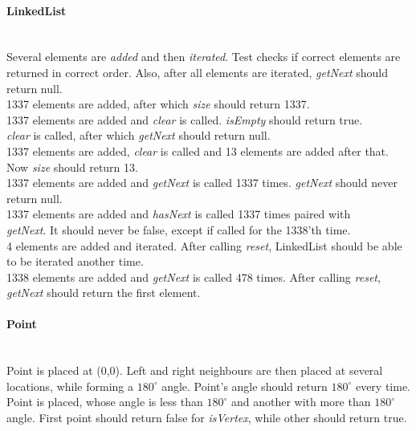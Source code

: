 \documentclass[a4paper,12pt]{article}
\begin{document}
\paragraph{\large LinkedList} \hspace{0pt} \\
Several elements are \emph{added} and then \emph{iterated}. Test checks if correct elements are returned in correct order. Also, after all elements are iterated, \emph{getNext} should return null.\\
1337 elements are added, after which \emph{size} should return 1337.\\
1337 elements are added and \emph{clear} is called. \emph{isEmpty} should return true.\\
\emph{clear} is called, after which \emph{getNext} should return null.\\
1337 elements are added, \emph{clear} is called and 13 elements are added after that. Now \emph{size} should return 13.\\
1337 elements are added and \emph{getNext} is called 1337 times. \emph{getNext} should never return null.\\
1337 elements are added and \emph{hasNext} is called 1337 times paired with\\ \emph{getNext}. It should never be false, except if called for the 1338'th time.\\
4 elements are added and iterated. After calling \emph{reset}, LinkedList should be able to be iterated another time.\\
1338 elements are added and \emph{getNext} is called 478 times. After calling \emph{reset}, \emph{getNext} should return the first element.

\paragraph{\large Point} \hspace{0pt} \\
Point is placed at (0,0). Left and right neighbours are then placed at several locations, while forming a $180^{\circ}$ angle. Point's angle should return $180^{\circ}$ every time.\\
Point is placed, whose angle is less than $180^{\circ}$ and another with more than $180^{\circ}$ angle. First point should return false for \emph{isVertex}, while other should return true.
\end{document}

